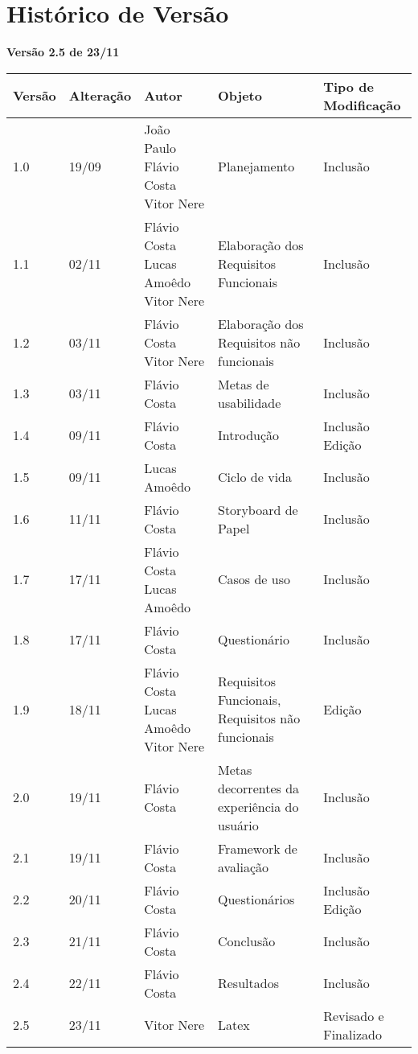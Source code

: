 \chapter[Histórico de Versão]{Histórico de Versão}

\begin{center}
	\textbf{Versão 2.5 de 23/11}
\end{center}

\begin{table}[H]
	\centering
	\begin{tabular}{| p{2cm} | p{3cm} | p{4cm} | p{3cm} | p{3cm} |}
		\hline 
		Versão & Alteração & Autor & Objeto & Tipo de Modificação\tabularnewline
		\hline 
		\hline 
		1.0 & 19/09 & João Paulo 
		Flávio Costa 
		Vitor Nere & Planejamento & Inclusão\tabularnewline
		\hline 
		1.1 & 02/11 & Flávio Costa 
		Lucas Amoêdo 
		Vitor Nere & Elaboração dos Requisitos Funcionais & Inclusão\tabularnewline
		\hline 
		1.2 & 03/11 & Flávio Costa 
		Vitor Nere & Elaboração dos Requisitos não funcionais & Inclusão\tabularnewline
		\hline 
		1.3 & 03/11 & Flávio Costa & Metas de usabilidade & Inclusão\tabularnewline
		\hline 
		1.4 & 09/11 & Flávio Costa & Introdução & Inclusão Edição\tabularnewline
		\hline 
		1.5 & 09/11 & Lucas Amoêdo & Ciclo de vida & Inclusão\tabularnewline
		\hline 
		1.6 & 11/11 & Flávio Costa & Storyboard de Papel & Inclusão\tabularnewline
		\hline 
		1.7 & 17/11 & Flávio Costa 
		Lucas Amoêdo & Casos de uso & Inclusão\tabularnewline
		\hline 
		1.8 & 17/11 & Flávio Costa & Questionário & Inclusão\tabularnewline
		\hline 
		1.9 & 18/11 & Flávio Costa 
		Lucas Amoêdo 
		Vitor Nere & Requisitos Funcionais, Requisitos não funcionais & Edição\tabularnewline
		\hline 
		2.0 & 19/11 & Flávio Costa & Metas decorrentes da experiência do usuário & Inclusão\tabularnewline
		\hline 
		2.1 & 19/11 & Flávio Costa & Framework de avaliação & Inclusão\tabularnewline
		\hline 
		2.2 & 20/11 & Flávio Costa & Questionários & Inclusão
		Edição\tabularnewline
		\hline 
		2.3 & 21/11 & Flávio Costa & Conclusão & Inclusão\tabularnewline
		\hline 
		2.4 & 22/11 & Flávio Costa & Resultados & Inclusão\tabularnewline
		\hline 
		2.5 & 23/11 & Vitor Nere & Latex & Revisado e Finalizado\tabularnewline
		\hline 
	\end{tabular}
\end{table}